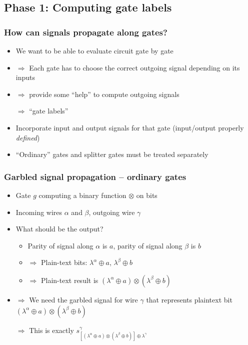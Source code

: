 \documentclass{beamer}
\begin{document}
\subsection{Phase 1: Computing gate labels}
\label{sec:phase-1-gate-labels}

\begin{frame}
  \frametitle{How can signals propagate along gates?}
  \begin{itemize}
  \item We want to be able to evaluate circuit gate by gate
  \item $\Rightarrow$ Each gate has to choose the correct outgoing signal depending on its inputs
  \item $\Rightarrow$ provide some ``help'' to compute outgoing signals

    $\Rightarrow$ ``gate labels''
  \item Incorporate input and output signals for that gate (input/output properly \emph{defined})
  \item ``Ordinary'' gates and splitter gates must be treated separately
  \end{itemize}
\end{frame}

\begin{frame}
  \frametitle{Garbled signal propagation -- ordinary gates}
  \begin{itemize}
  \item Gate $g$ computing a binary function $\otimes$ on bits
  \item Incoming wires $\alpha$ and $\beta$, outgoing wire $\gamma$
  \item What should be the output?
    \begin{itemize}
    \item Parity of signal along $\alpha$ is $a$, parity of signal along $\beta$ is $b$
    \item $\Rightarrow$ Plain-text bits: $\lambda^\alpha \oplus a$, $\lambda^\beta\oplus b$
    \item $\Rightarrow$ Plain-text result is $(\lambda^\alpha \oplus a) \otimes (\lambda^\beta \oplus b)$
    \end{itemize}

  \item $\Rightarrow$ We need the garbled signal for wire $\gamma$ that represents plaintext bit $(\lambda^\alpha \oplus a) \otimes (\lambda^\beta \oplus b)$

    $\Rightarrow$ This is exactly $s^\gamma_{[(\lambda^\alpha \oplus a) \otimes (\lambda^\beta \oplus b)]\oplus \lambda^\gamma}$
  \end{itemize}
\end{frame}
\end{document}
